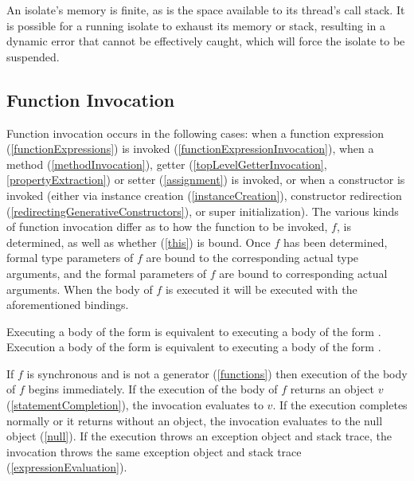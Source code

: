 \documentclass[makeidx]{article}
\begin{document}
{\LMHash{}%
An isolate's memory is finite, as is the space available to its thread's call stack.
It is possible for a running isolate to exhaust its memory or stack,
resulting in a dynamic error that cannot be effectively caught,
which will force the isolate to be suspended.



\subsection{Function Invocation}

\LMHash{}%
Function invocation occurs in the following cases:
when a function expression (\ref{functionExpressions}) is invoked (\ref{functionExpressionInvocation}),
when a method (\ref{methodInvocation}), getter (\ref{topLevelGetterInvocation}, \ref{propertyExtraction}) or setter (\ref{assignment}) is invoked,
or when a constructor is invoked
(either via instance creation (\ref{instanceCreation}), constructor redirection (\ref{redirectingGenerativeConstructors}), or super initialization).
The various kinds of function invocation differ as to how the function to be invoked, $f$, is determined, as well as whether \THIS{} (\ref{this}) is bound.
Once $f$ has been determined,
formal type parameters of $f$ are bound to the corresponding actual type arguments,
and the formal parameters of $f$ are bound to corresponding actual arguments.
When the body of $f$ is executed it will be executed with the aforementioned bindings.

\LMHash{}%
Executing a body of the form  is equivalent to executing a body of the form .
Execution a body of the form  is equivalent to executing a body of the form .

\LMHash{}%
If $f$ is synchronous and is not a generator (\ref{functions}) then execution of the body of $f$ begins immediately.
If the execution of the body of $f$ returns an object $v$
(\ref{statementCompletion}),
the invocation evaluates to $v$.
If the execution completes normally or it returns without an object,
the invocation evaluates to the null object (\ref{null}).
If the execution throws an exception object and stack trace,
the invocation throws the same exception object and stack trace
(\ref{expressionEvaluation}).

}
\end{document}
